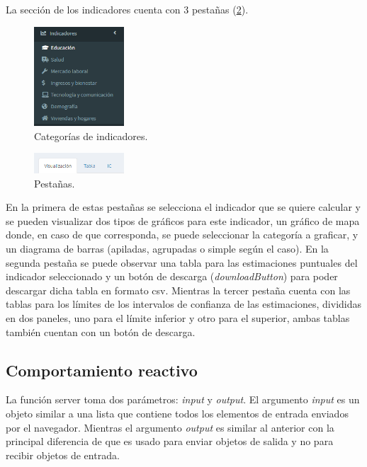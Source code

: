 \documentclass[12pt,twoside,spanish,a4paper]{book}\usepackage[]{graphicx}\usepackage[]{color}
\begin{document}
La sección de los indicadores cuenta con 3 pestañas (\ref{pest}).

\begin{figure}[h]
\begin{center}
\includegraphics[width=0.30\textwidth]{img/cat.PNG}
\caption{Categorías de indicadores. \label{cat}}
\end{center}
\end{figure}

\begin{figure}[h]
\begin{center}
\includegraphics[width=0.30\textwidth]{img/pest.PNG}
\caption{Pestañas. \label{pest}}
\end{center}
\end{figure}

En la primera de estas pestañas se selecciona el indicador que se quiere calcular y se pueden visualizar dos tipos de gráficos para este indicador, un gráfico de mapa donde, en caso de que corresponda, se puede seleccionar la categoría a graficar, y un diagrama de barras (apiladas, agrupadas o simple según el caso). En la segunda pestaña se puede observar una tabla para las estimaciones puntuales del indicador seleccionado y un botón de descarga (\textit{downloadButton}) para poder descargar dicha tabla en formato csv. Mientras la tercer pestaña cuenta con las tablas para los límites de los intervalos de confianza de las estimaciones, divididas en dos paneles, uno para el límite inferior y otro para el superior, ambas tablas también cuentan con un botón de descarga.

\subsection{Comportamiento reactivo \label{subsec:server}}

La función server toma dos parámetros: \emph{input} y \emph{output}. El argumento \emph{input} es un objeto similar a una lista que contiene todos los elementos de entrada enviados por el navegador. Mientras el argumento \emph{output} es similar al anterior con la principal diferencia de que es usado para enviar objetos de salida y no para recibir objetos de entrada.
\end{document}
